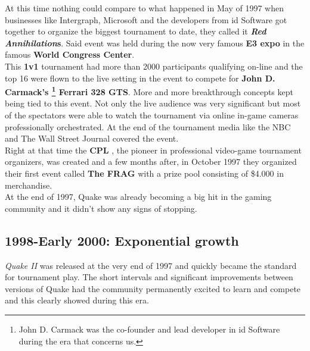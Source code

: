 At this time nothing could compare to what happened in May of 1997 when businesses like Intergraph, Microsoft and the developers from id Software got together to organize the biggest tournament to date, they called it \textbf{\textit{Red Annihilation}s}. Said event was held during the now very famous \textbf{E3 expo} \citep{e3} in the famous \textbf{World Congress Center}.\\

This \textbf{1v1} tournament had more than 2000 participants qualifying on-line and the top 16 were flown to the live setting in the event to compete for \textbf{John D. Carmack's \footnote{John D. Carmack was the co-founder and lead developer in id Software during the era that concerns us.} Ferrari 328 GTS}. More and more breakthrough concepts kept being tied to this event. Not only the live audience was very significant but most of the spectators were able to watch the tournament via online in-game cameras professionally orchestrated. At the end of the tournament media like the NBC and The Wall Street Journal covered the event.\\

Right at that time the \textbf{CPL} \citep{web:cpl}, the pioneer in professional video-game tournament organizers, was created and a few months after, in October 1997 they organized their first event called \textbf{The FRAG} with a prize pool consisting of \$4.000 in merchandise.\\

At the end of 1997, Quake was already becoming a big hit in the gaming community and it didn't show any signs of stopping.\\

\subsection{1998-Early 2000: Exponential growth}


\textit{Quake II} \citep{game:quake2} was released at the very end of 1997 and quickly became the standard for tournament play. The short intervals and significant improvements between versions of Quake had the community permanently excited to learn and compete and this clearly showed during this era.\\

